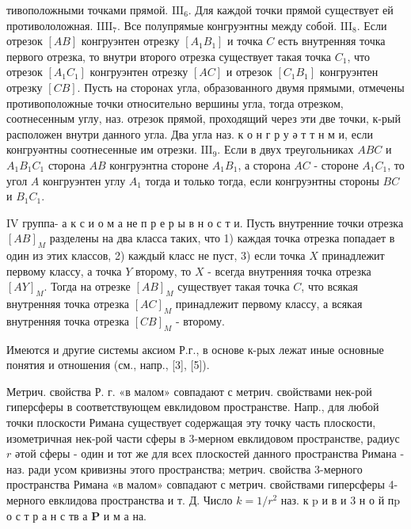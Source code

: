 \documentclass[10pt]{article}
\begin{document}
тивоположными точками прямой. $\mathrm{III}_{6}$. Для каждой точки прямой существует ей противололожная. $\mathrm{III} \mathrm{I}_{7}$. Все полупрямые конгруэнтны между собой. $\mathrm{III}_{8}$. Если отрезок $[A B]$ конгруэнтен отрезку $\left[A_{1} B_{1}\right]$ и точка $C$ есть внутренняя точка первого отрезка, то внутри второго отрезка существует такая точка $C_{1}$, что отрезок $\left[A_{1} C_{1}\right]$ конгруэнтен отрезку $[A C]$ и отрезок $\left[C_{1} B_{1}\right]$ конгруэнтен отрезку $[C B]$. Пусть на сторонах угла, образованного двумя прямыми, отмечены противоположные точки относительно вершины угла, тогда отрезком, соотнесенным углу, наз. отрезок прямой, проходящий через эти две точки, к-рый расположен внутри данного угла. Два угла наз. к о н г р у ә т т н м и, если конгруәнтны соотнесенные им отрезки. $\mathrm{III}_{9}$. Если в двух треугольниках $A B C$ и $A_{1} B_{1} C_{1}$ сторона $A B$ конгруэнтна стороне $A_{1} B_{1}$, а сторона $A C$ - стороне $A_{1} C_{1}$, то угол $A$ конгруэнтен углу $A_{1}$ тогда и только тогда, если конгруэнтны стороны $B C$ и $B_{1} C_{1}$.



IV группа- а к с и о м а не п р е р ы в н о с т и. Пусть внутренние точки отрезка $[A B]_{M}$ разделены на два класса таких, что 1) каждая точка отрезка попадает в один из этих классов, 2) каждый класс не пуст, 3) если точка $X$ принадлежит первому классу, а точка $Y$ второму, то $X$ - всегда внутренняя точка отрезка $[A Y]_{M}$. Тогда на отрезке $[A B]_{M}$ существует такая точка $C$, что всякая внутренняя точка отрезка $[A C]_{M}$ принадлежит первому классу, а всякая внутренняя точка отрезка $[C B]_{M}$ - второму.



Имеются и другие системы аксиом Р.г., в основе к-рых лежат иные основные понятия и отношения (см., напр., [3], [5]).



Метрич. свойства Р. г. «в малом» совпадают с метрич. свойствами нек-рой гиперсферы в соответствующем евклидовом пространстве. Напр., для любой точки плоскости Римана существует содержащая эту точку часть плоскости, изометричная нек-рой части сферы в 3-мерном евклидовом пространстве, радиус $r$ әтой сферы - один и тот же для всех плоскостей данного пространства Римана - наз. ради усом кривизны этого пространства; метрич. свойства 3-мерного пространства Римана «в малом» совпадают с метрич. свойствами гиперсферы 4-мерного евклидова пространства и т. Д. Число $k=1 / r^{2}$ наз. к $\mathrm{p}$ и в и 3 н о й $п \mathrm{p}$ о с т р а н с тв а $\mathbf{P}$ и м а на.
\end{document}
